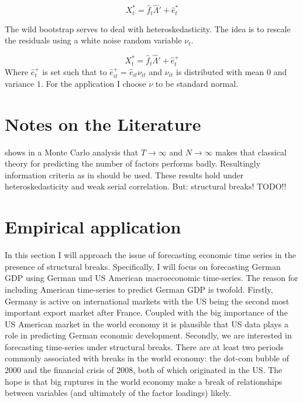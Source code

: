 \documentclass[12pt]{article}
\begin{document}
\begin{equation}
	\label{factor equation, bootstrapped}
	X_t^* = \hat f_t \hat \Lambda' + \hat e_t^*
\end{equation}

The wild bootstrap serves to deal with heteroskedasticity. The idea is to rescale the residuals using a white noise random variable $\nu_t$.

$$X_t^* = \hat f_t \hat \Lambda' + \hat e_t^+$$
Where $\hat e_t^+$ is set such that to $\hat e_{it}^+ = \hat e_{it} \nu_{it}$ and $\nu_{it}$ is distributed with mean $0$ and variance $1$. For the application I choose $\nu$ to be standard normal.




\section{Notes on the Literature}
\citet{cragg1997inferring} shows in a Monte Carlo analysis that $T\rightarrow\infty$ and $N\rightarrow\infty$ makes that classical theory for predicting the number of factors performs badly. Resultingly information criteria as in \citet{bai2002determining} should be used. These results hold under heteroskedasticity and weak serial correlation. But: structural breaks! TODO!!




\section{Empirical application}
In this section I will approach the issue of forecasting economic time series in the presence of structural breaks. Specifically, I will focus on forecasting German GDP using German und US American macroeconomic time-series. The reason for including American time-series to predict German GDP is twofold. Firstly, Germany is active on international markets with the US being the second most important export market after France. Coupled with the big importance of the US American market in the world economy it is plausible that US data plays a role in predicting German economic development. Secondly, we are interested in forecasting time-series under structural breaks. There are at least two periods commonly associated with breaks in the world economy: the dot-com bubble of 2000 and the financial crisis of 2008, both of which originated in the US. The hope is that big ruptures in the world economy make a break of relationships between variables (and ultimately of the factor loadings) likely.
\end{document}
